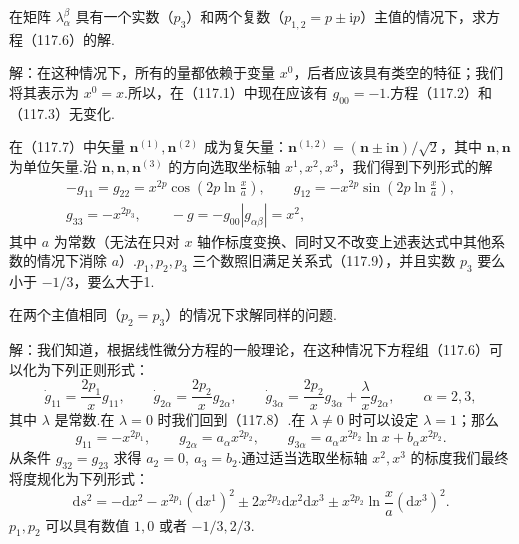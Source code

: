 \begin{xiti}

\quad 在矩阵 $\lambda_{\alpha}^{\beta}$ 具有一个实数（$p_{3}$）和两个复数（$p_{1,2}=p\pm\mathrm{i}p$）主值的情况下，求方程（117.6）的解.

解：在这种情况下，所有的量都依赖于变量 $x^{0}$，后者应该具有类空的特征；我们将其表示为 $x^{0}=x$.所以，在（117.1）中现在应该有 $g_{00}=-1$.方程（117.2）和（117.3）无变化.

在（117.7）中矢量 $\boldsymbol{n}^{(1)},\boldsymbol{n}^{(2)}$ 成为复矢量：$\boldsymbol{n}^{(1,2)}=(\boldsymbol{n}\pm\mathrm{i}\boldsymbol{n})/\sqrt{2}$，其中 $\boldsymbol{n},\boldsymbol{n}$ 为单位矢量.沿 $\boldsymbol{n},\boldsymbol{n},\boldsymbol{n}^{(3)}$ 的方向选取坐标轴 $x^{1},x^{2},x^{3}$，我们得到下列形式的解
\begin{equation*}
  \begin{gathered}
    -g_{11}=g_{22}=x^{2p}\cos\left(2p\ln\frac{x}{a}\right),\qquad
    g_{12}=-x^{2p}\sin\left(2p\ln\frac{x}{a}\right),\\
    g_{33}=-x^{2p_{3}},\qquad
    -g=-g_{00}|g_{\alpha\beta}|=x^{2},
  \end{gathered}
\end{equation*}
其中 $a$ 为常数（无法在只对 $x$ 轴作标度变换、同时又不改变上述表达式中其他系数的情况下消除 $a$）.$p_{1},p_{2},p_{3}$ 三个数照旧满足关系式（117.9），并且实数 $p_{3}$ 要么小于 $-1/3$，要么大于1.

\quad 在两个主值相同（$p_{2}=p_{3}$）的情况下求解同样的问题.

解：我们知道，根据线性微分方程的一般理论，在这种情况下方程组（117.6）可以化为下列正则形式：
\begin{equation*}
  \dot{g}_{11}=\frac{2p_{1}}{x}g_{11},\qquad
  \dot{g}_{2\alpha}=\frac{2p_{2}}{x}g_{2\alpha},\qquad
  \dot{g}_{3\alpha}=\frac{2p_{2}}{x}g_{3\alpha}
  +\frac{\lambda}{x}g_{2\alpha},\qquad\alpha=2,3,
\end{equation*}
其中 $\lambda$ 是常数.在 $\lambda=0$ 时我们回到（117.8）.在 $\lambda\neq0$ 时可以设定 $\lambda=1$；那么
\begin{equation*}
  g_{11}=-x^{2p_{1}},\qquad
  g_{2\alpha}=a_{\alpha}x^{2p_{2}},\qquad
  g_{3\alpha}=a_{\alpha}x^{2p_{2}}\ln x+b_{\alpha}x^{2p_{2}}.
\end{equation*}
从条件 $g_{32}=g_{23}$ 求得 $a_{2}=0,\ a_{3}=b_{2}$.通过适当选取坐标轴 $x^{2},x^{3}$ 的标度我们最终将度规化为下列形式：
\begin{equation*}
  \mathrm{d}s^{2}=-\mathrm{d}x^{2}
  -x^{2p_{1}}(\mathrm{d}x^{1})^{2}
  \pm2x^{2p_{2}}\mathrm{d}x^{2}\mathrm{d}x^{3}
  \pm x^{2p_{2}}\ln\frac{x}{a}(\mathrm{d}x^{3})^{2}.
\end{equation*}
$p_{1},p_{2}$ 可以具有数值 $1,0$ 或者 $-1/3,2/3$.


\end{xiti}
